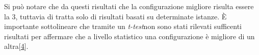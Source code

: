 Si può notare che da questi risultati che la configurazione migliore risulta essere la 3, tuttavia di tratta solo di risultati basati su determinate istanze. È importante sottolineare che tramite un \emph{t-test}\glsfirstoccur non sono stati rilevati sufficenti risultati per affermare che a livello statistico una configurazione è migliore di un altra[\hyperlink{bibliografia}{4}]. 





